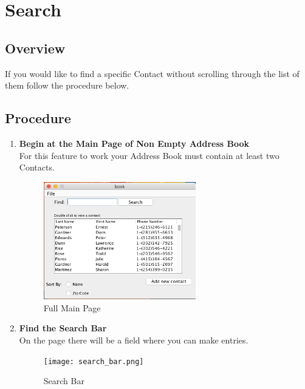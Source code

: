 \documentclass[a4paper, 11pt]{article}
\begin{document}
\clearpage

\section{Search}
\subsection{Overview}
If you would like to find a specific Contact without scrolling through the list of them follow the procedure below.
\subsection{Procedure}
\begin{enumerate}[label=\textbf{\arabic*})]
    \item{\textbf{Begin at the Main Page of Non Empty Address Book}}\\ For this feature to work your Address Book must contain at least two Contacts.
    
    \begin{figure}[h!]
    \centering
      \includegraphics[width=250]{main_page_full.png}
      \caption{Full Main Page}
    \end{figure}
    
    \item{\textbf{Find the Search Bar}}\\ On the page there will be a field where you can make entries. 
    
    \begin{figure}[h!]
    \centering
      \texttt{[image: search\_bar.png]}
      \caption{Search Bar}
    \end{figure}
    

\end{enumerate}
\end{document}
